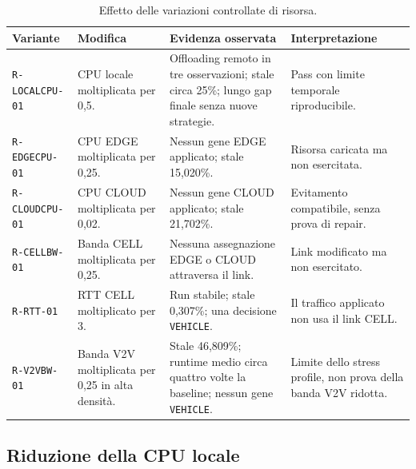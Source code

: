 \begin{table}[htbp]
    \centering
    \caption{Effetto delle variazioni controllate di risorsa.}
    \label{tab:exp_risorse}
    \footnotesize
    \begin{tabularx}{\textwidth}{
        >{\raggedright\arraybackslash}p{}
        >{\raggedright\arraybackslash}p{}
        >{\raggedright\arraybackslash}X
        >{\raggedright\arraybackslash}p{}
    }
        \toprule
        \textbf{Variante} &
        \textbf{Modifica} &
        \textbf{Evidenza osservata} &
        \textbf{Interpretazione} \\
        \midrule
        \texttt{R-LOCALCPU-01} &
        CPU locale moltiplicata per 0,5. &
        Offloading remoto in tre osservazioni; stale circa 25\%; lungo gap finale senza nuove strategie. &
        Pass con limite temporale riproducibile. \\
        \texttt{R-EDGECPU-01} &
        CPU EDGE moltiplicata per 0,25. &
        Nessun gene EDGE applicato; stale 15,020\%. &
        Risorsa caricata ma non esercitata. \\
        \texttt{R-CLOUDCPU-01} &
        CPU CLOUD moltiplicata per 0,02. &
        Nessun gene CLOUD applicato; stale 21,702\%. &
        Evitamento compatibile, senza prova di repair. \\
        \texttt{R-CELLBW-01} &
        Banda CELL moltiplicata per 0,25. &
        Nessuna assegnazione EDGE o CLOUD attraversa il link. &
        Link modificato ma non esercitato. \\
        \texttt{R-RTT-01} &
        RTT CELL moltiplicato per 3. &
        Run stabile; stale 0,307\%; una decisione \texttt{VEHICLE}. &
        Il traffico applicato non usa il link CELL. \\
        \texttt{R-V2VBW-01} &
        Banda V2V moltiplicata per 0,25 in alta densità. &
        Stale 46,809\%; runtime medio circa quattro volte la baseline; nessun gene \texttt{VEHICLE}. &
        Limite dello stress profile, non prova della banda V2V ridotta. \\
        \bottomrule
    \end{tabularx}
\end{table}

\subsection{Riduzione della CPU locale}
\label{subsec:exp_localcpu}


